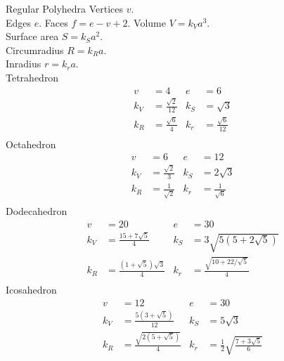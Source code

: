\begin{algorithm}{Regular Polyhedra}
\desc
Vertices $v$.\\
Edges $e$.
Faces $f = e-v+2$.
Volume $V = k_V a^3$.\\
Surface area $S = k_S a^2$.\\
Circumradius $R = k_R a$.\\
Inradius $r = k_r a$.\\

Tetrahedron
\begin{align*} 
  v &= 4 & e &= 6\\
  k_V &= \frac{\sqrt{2}}{12} & k_S &= \sqrt{3}\\
  k_R &= \frac{\sqrt{6}}{4}    & k_r &= \frac{\sqrt{6}}{12}\\
\end{align*}
Octahedron
\begin{align*} 
  v &= 6 & e &= 12\\
  k_V &= \frac{\sqrt{2}}{3} & k_S &= 2\sqrt{3}\\
  k_R &= \frac{1}{\sqrt{2}}    & k_r &= \frac{1}{\sqrt{6}}\\
\end{align*}
Dodecahedron
\begin{align*} 
  v &= 20 & e &= 30\\
  k_V &= \frac{15 + 7\sqrt{5}}{4} & k_S &= 3\sqrt{5(5+2\sqrt{5})}\\
  k_R &= \frac{(1+\sqrt{5})\sqrt{3}}{4} & k_r &= \frac{\sqrt{10 + 22/\sqrt{5}}}{4}\\
\end{align*}
Icosahedron
\begin{align*}
  v &= 12 & e &= 30\\
  k_V &= \frac{5(3 + \sqrt{5})}{12} & k_S &= 5\sqrt{3}\\
  k_R &= \frac{\sqrt{2(5+\sqrt{5})}}{4} & k_r &= \frac{1}{2}\sqrt{\frac{7+3\sqrt{5}}{6}}\\
\end{align*}
  
\end{algorithm}